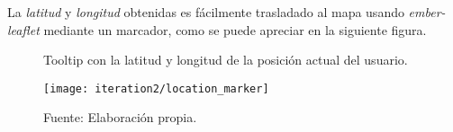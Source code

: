 La \emph{latitud} y \emph{longitud} obtenidas es fácilmente trasladado al mapa usando \emph{ember-leaflet} mediante un marcador, como se puede apreciar en la siguiente figura.

\begin{figure}[H]
  \begin{center}
    \caption{Tooltip con la latitud y longitud de la posición actual del usuario.}
    \label{fig:location_marker}
    \texttt{[image: iteration2/location\_marker]}
    \caption*{Fuente: Elaboración propia.}
  \end{center}
\end{figure}


%
%
%
%



